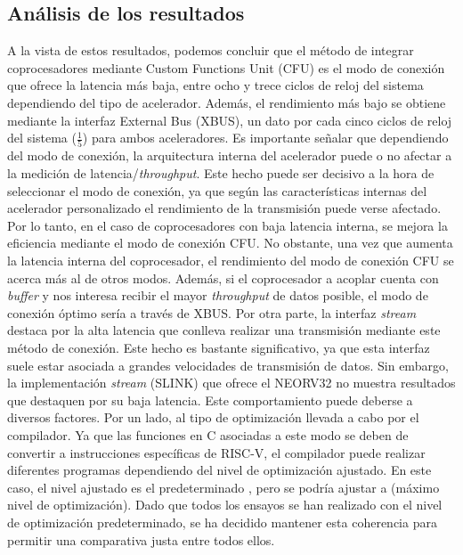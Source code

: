 \subsection{Análisis de los resultados}

\label{ana-carac}

A la vista de estos resultados, podemos concluir que el método de integrar coprocesadores mediante Custom Functions Unit (CFU) es el modo de conexión que ofrece la latencia más baja, entre ocho y trece ciclos de reloj del sistema dependiendo del tipo de acelerador.
Además, el rendimiento más bajo se obtiene mediante la interfaz External Bus (XBUS), un dato por cada cinco ciclos de reloj del sistema ($\frac{1}{5}$) para ambos aceleradores.
Es importante señalar que dependiendo del modo de conexión, la arquitectura interna del acelerador puede o no afectar a la medición de latencia/\textit{throughput}.
Este hecho puede ser decisivo a la hora de seleccionar el modo de conexión, ya que según las características internas del acelerador personalizado el rendimiento de la transmisión puede verse afectado.
Por lo tanto, en el caso de coprocesadores con baja latencia interna, se mejora la eficiencia mediante el modo de conexión CFU.
No obstante, una vez que aumenta la latencia interna del coprocesador, el rendimiento del modo de conexión CFU se acerca más al de otros modos.
Además, si el coprocesador a acoplar cuenta con \textit{buffer} y nos interesa recibir el mayor \textit{throughput} de datos posible, el modo de conexión óptimo sería a través de XBUS.
Por otra parte, la interfaz \textit{stream} destaca por la alta latencia que conlleva realizar una transmisión mediante este método de conexión.
Este hecho es bastante significativo, ya que esta interfaz suele estar asociada a grandes velocidades de transmisión de datos.
Sin embargo, la implementación \textit{stream} (SLINK) que ofrece el NEORV32 no muestra resultados que destaquen por su baja latencia.
Este comportamiento puede deberse a diversos factores.
Por un lado, al tipo de optimización llevada a cabo por el compilador.
Ya que las funciones en C asociadas a este modo se deben de convertir a instrucciones específicas de RISC-V, el compilador puede realizar diferentes programas dependiendo del nivel de optimización ajustado.
En este caso, el nivel ajustado es el predeterminado , pero se podría ajustar a  (máximo nivel de optimización).
Dado que todos los ensayos se han realizado con el nivel de optimización predeterminado, se ha decidido mantener esta coherencia para permitir una comparativa justa entre todos ellos.
